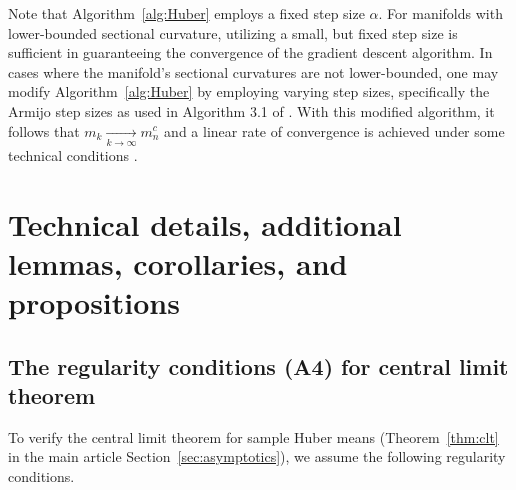 \documentclass[preprint]{imsart}
\theoremstyle{plain}
\theoremstyle{remark}
\begin{document}
\begin{appendix}
Note that Algorithm~\ref{alg:Huber} employs a fixed step size $\alpha$. For manifolds with lower-bounded sectional curvature, utilizing a small, but fixed step size is sufficient in guaranteeing the convergence of the gradient descent algorithm. In cases where the manifold's sectional curvatures are not lower-bounded, one may modify Algorithm~\ref{alg:Huber} by employing varying step sizes, specifically the Armijo step sizes as used in Algorithm 3.1 of \cite{wang2021convergence}. With this modified algorithm, it follows that $m_{k} \underset{k \rightarrow \infty}{\rightarrow} m^{c}_{n}$ and a linear rate of convergence is achieved under some technical conditions \citep[see Theorem 3.6,][]{wang2021convergence}. 



\section{Technical details, additional lemmas, corollaries, and propositions}\label{appendix:B}

\subsection{The regularity conditions (A4) for central limit theorem}


To verify the central limit theorem for sample Huber means (Theorem~\ref{thm:clt} in the main article Section~\ref{sec:asymptotics}), we assume the following regularity conditions. 


\end{appendix}
\end{document}
